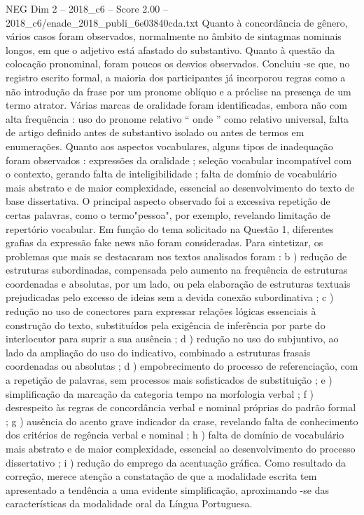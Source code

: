 \begin{textsample}{NEG Dim 2 – 2018\_c6 – Score 2.00 – 2018\_c6/enade\_2018\_publi\_6e03840cda.txt}
Quanto à concordância de gênero, vários casos foram observados, normalmente no âmbito de sintagmas nominais longos, em que o adjetivo está afastado do substantivo.
Quanto à questão da colocação pronominal, foram poucos os desvios observados.
Concluiu -se que, no registro escrito formal, a maioria dos participantes já incorporou regras como a não introdução da frase por um pronome oblíquo e a próclise na presença de um termo atrator.
Várias marcas de oralidade foram identificadas, embora não com alta frequência : uso do pronome relativo “ onde ” como relativo universal, falta de artigo definido antes de substantivo isolado ou antes de termos em enumerações.
Quanto aos aspectos vocabulares, alguns tipos de inadequação foram observados : expressões da oralidade ; seleção vocabular incompatível com o contexto, gerando falta de inteligibilidade ; falta de domínio de vocabulário mais abstrato e de maior complexidade, essencial ao desenvolvimento do texto de base dissertativa.
O principal aspecto observado foi a excessiva repetição de certas palavras, como o termo"pessoa", por exemplo, revelando limitação de repertório vocabular.
Em função do tema solicitado na Questão 1, diferentes grafias da expressão fake news não foram consideradas.
Para sintetizar, os problemas que mais se destacaram nos textos analisados foram : b ) redução de estruturas subordinadas, compensada pelo aumento na frequência de estruturas coordenadas e absolutas, por um lado, ou pela elaboração de estruturas textuais prejudicadas pelo excesso de ideias sem a devida conexão subordinativa ; c ) redução no uso de conectores para expressar relações lógicas essenciais à construção do texto, substituídos pela exigência de inferência por parte do interlocutor para suprir a sua ausência ; d ) redução no uso do subjuntivo, ao lado da ampliação do uso do indicativo, combinado a estruturas frasais coordenadas ou absolutas ; d ) empobrecimento do processo de referenciação, com a repetição de palavras, sem processos mais sofisticados de substituição ; e ) simplificação da marcação da categoria tempo na morfologia verbal ; f ) desrespeito às regras de concordância verbal e nominal próprias do padrão formal ; g ) ausência do acento grave indicador da crase, revelando falta de conhecimento dos critérios de regência verbal e nominal ; h ) falta de domínio de vocabulário mais abstrato e de maior complexidade, essencial ao desenvolvimento do processo dissertativo ; i ) redução do emprego da acentuação gráfica.
Como resultado da correção, merece atenção a constatação de que a modalidade escrita tem apresentado a tendência a uma evidente simplificação, aproximando -se das características da modalidade oral da Língua Portuguesa.

\end{textsample}
